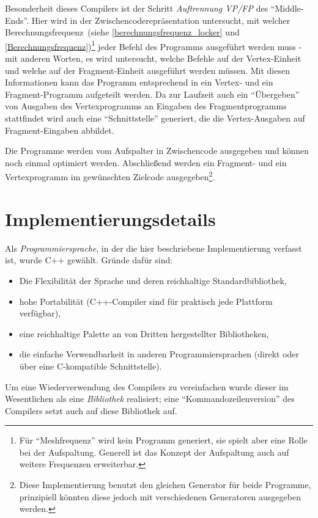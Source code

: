 \documentclass[twoside,a4paper,fleqn,12pt]{book}
\begin{document}
Besonderheit dieses Compilers ist der Schritt \emph{Auftrennung VP/FP} des "`Middle-Ends"'. Hier wird in der Zwischencoderepräsentation untersucht, mit
welcher Berechnungsfrequenz~(siehe \ref{berechnungsfrequenz_locker} und
\ref{Berechnungsfrequenz})\footnote{Für "`Meshfrequenz"' wird kein Programm generiert, sie spielt aber eine Rolle bei der Aufspaltung.
    Generell ist das Konzept der Aufspaltung auch auf weitere Frequenzen erweiterbar.}
jeder Befehl des Programms ausgeführt werden muss - mit anderen Worten,
es wird untersucht, welche Befehle auf der Vertex-Einheit und welche auf der Fragment-Einheit ausgeführt werden müssen. Mit diesen Informationen kann
das Programm entsprechend in ein Vertex- und ein Fragment-Programm aufgeteilt werden. Da zur Laufzeit auch ein "`Übergeben"' von Ausgaben
des Vertexprogramms an Eingaben des Fragmentprogramms stattfindet wird auch eine "`Schnittstelle"' generiert, die die Vertex-Ausgaben auf Fragment-Eingaben
abbildet.

Die Programme werden vom Aufspalter in Zwischencode ausgegeben und können noch einmal optimiert werden. %
Abschließend werden ein Fragment- und ein Vertexprogramm im gewünschten Zielcode ausgegeben\footnote{Diese Implementierung benutzt den
gleichen Generator für beide Programme, prinzipiell könnten diese jedoch mit verschiedenen Generatoren ausgegeben werden.}.

\section{Implementierungsdetails}

Als \emph{Programmiersprache}, in der die hier beschriebene Implementierung verfasst ist, wurde C++ gewählt.
Gründe dafür sind:
\begin{itemize}
\item Die Flexibilität der Sprache und deren reichhaltige Standardbibliothek,
\item hohe Portabilität (C++-Compiler sind für praktisch jede Plattform verfügbar),
\item eine reichhaltige Palette an von Dritten hergestellter Bibliotheken,
\item die einfache Verwendbarkeit in anderen Programmiersprachen (direkt oder über eine C-kompatible Schnittstelle).%
\end{itemize}
 
Um eine Wiederverwendung des Compilers zu vereinfachen wurde dieser im Wesentlichen als eine \emph{Bibliothek} realisiert;
eine "`Kommandozeilenversion"' des Compilers setzt auch auf diese Bibliothek auf.
 
\end{document}

